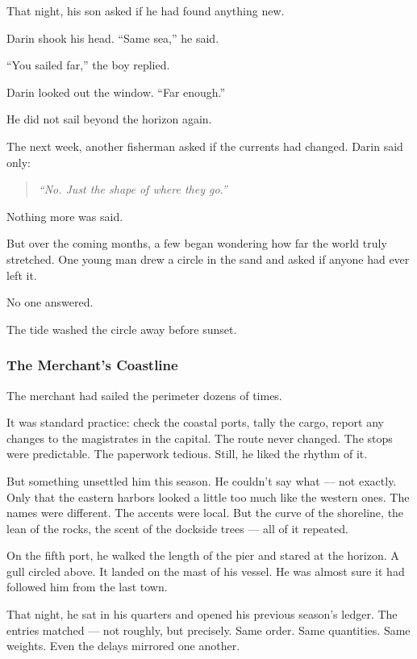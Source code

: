 \documentclass[12pt]{article}
\begin{document}
That night, his son asked if he had found anything new.

Darin shook his head. ``Same sea,'' he said.

``You sailed far,'' the boy replied.

Darin looked out the window. ``Far enough.''

He did not sail beyond the horizon again.

The next week, another fisherman asked if the currents had changed. Darin said only:

\begin{quote}
\emph{``No. Just the shape of where they go.''}
\end{quote}

Nothing more was said.

But over the coming months, a few began wondering how far the world truly stretched. One young man drew a circle in the sand and asked if anyone had ever left it.

No one answered.

The tide washed the circle away before sunset.

\dotfill

\subsubsection*{The Merchant’s Coastline}

The merchant had sailed the perimeter dozens of times.

It was standard practice: check the coastal ports, tally the cargo, report any changes to the magistrates in the capital. The route never changed. The stops were predictable. The paperwork tedious. Still, he liked the rhythm of it.

But something unsettled him this season. He couldn’t say what — not exactly. Only that the eastern harbors looked a little too much like the western ones. The names were different. The accents were local. But the curve of the shoreline, the lean of the rocks, the scent of the dockside trees — all of it repeated.

On the fifth port, he walked the length of the pier and stared at the horizon. A gull circled above. It landed on the mast of his vessel. He was almost sure it had followed him from the last town.

That night, he sat in his quarters and opened his previous season’s ledger. The entries matched — not roughly, but precisely. Same order. Same quantities. Same weights. Even the delays mirrored one another.
\end{document}
